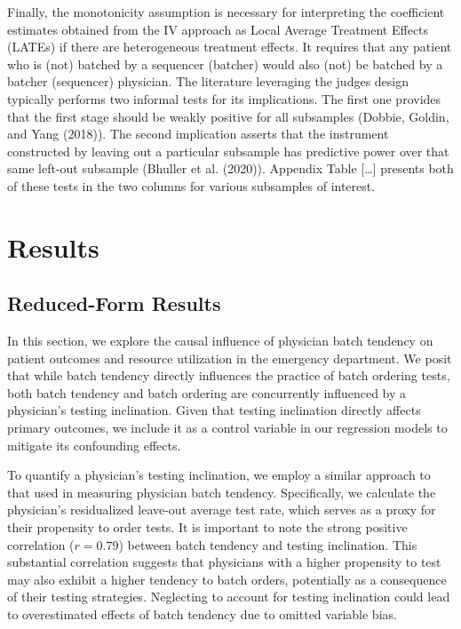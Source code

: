 \documentclass{article}
\begin{document}
Finally, the monotonicity assumption is necessary for interpreting the
coefficient estimates obtained from the IV approach as Local Average
Treatment Effects (LATEs) if there are heterogeneous treatment effects.
It requires that any patient who is (not) batched by a sequencer
(batcher) would also (not) be batched by a batcher (sequencer)
physician. The literature leveraging the judges design typically
performs two informal tests for its implications. The first one provides
that the first stage should be weakly positive for all subsamples
(Dobbie, Goldin, and Yang (2018)). The second implication asserts that
the instrument constructed by leaving out a particular subsample has
predictive power over that same left-out subsample (Bhuller et al.
(2020)). Appendix Table {[}\ldots{]} presents both of these tests in the
two columns for various subsamples of interest.

\hypertarget{sec:4}{%
\section{Results}\label{sec:4}}

\hypertarget{reduced-form-results}{%
\subsection{Reduced-Form Results}\label{reduced-form-results}}

In this section, we explore the causal influence of physician batch
tendency on patient outcomes and resource utilization in the emergency
department. We posit that while batch tendency directly influences the
practice of batch ordering tests, both batch tendency and batch ordering
are concurrently influenced by a physician's testing inclination. Given
that testing inclination directly affects primary outcomes, we include
it as a control variable in our regression models to mitigate its
confounding effects.

To quantify a physician's testing inclination, we employ a similar
approach to that used in measuring physician batch tendency.
Specifically, we calculate the physician's residualized leave-out
average test rate, which serves as a proxy for their propensity to order
tests. It is important to note the strong positive correlation
(\(r = 0.79\)) between batch tendency and testing inclination. This
substantial correlation suggests that physicians with a higher
propensity to test may also exhibit a higher tendency to batch orders,
potentially as a consequence of their testing strategies. Neglecting to
account for testing inclination could lead to overestimated effects of
batch tendency due to omitted variable bias.
\end{document}
